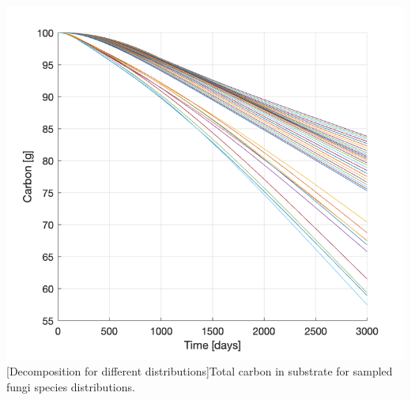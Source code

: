 \documentclass[12pt]{article}
\newenvironment{ColumnFigure}
{\par\medskip\noindent\minipage{\linewidth}}
{\endminipage\par\medskip}
\begin{document}
\begin{multicols}{2}
\begin{ColumnFigure}\label{Carbon Decrease Fungi Distribution}
	\centering
	\includegraphics[width=\linewidth]{carbon_decrease_fungi_distribution.png}
	[Decomposition for different distributions]{Total carbon in substrate for sampled fungi species distributions.}
\end{ColumnFigure}


\end{multicols}
\end{document}
